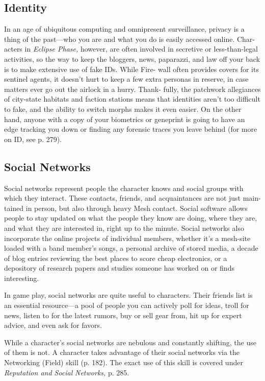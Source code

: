 \subsection{Identity}

In an age of ubiquitous computing and omnipresent 
surveillance, privacy is a thing of the past—who you 
are and what you do is easily accessed online. Char-
acters in \textit{Eclipse Phase,} however, are often involved 
in secretive or less-than-legal activities, so the way to 
keep the bloggers, news, paparazzi, and law off your 
back is to make extensive use of fake IDs. While Fire-
wall often provides covers for its sentinel agents, it 
doesn't hurt to keep a few extra personas in reserve, in 
case matters ever go out the airlock in a hurry. Thank-
fully, the patchwork allegiances of city-state habitats 
and faction stations means that identities aren't too 
difficult to fake, and the ability to switch morphs 
makes it even easier. On the other hand, anyone with a 
copy of your biometrics or geneprint is going to have 
an edge tracking you down or finding any forensic 
traces you leave behind (for more on ID, see p. 279).

\subsection{Social Networks}

Social networks represent people the character knows 
and social groups with which they interact. These 
contacts, friends, and acquaintances are not just main-
tained in person, but also through heavy Mesh contact. 
Social software allows people to stay updated on what 
the people they know are doing, where they are, and 
what they are interested in, right up to the minute. 
Social networks also incorporate the online projects 
of individual members, whether it's a mesh-site loaded 
with a band member's songs, a personal archive of 
stored media, a decade of blog entries reviewing the 
best places to score cheap electronics, or a depository 
of research papers and studies someone has worked 
on or finds interesting.

In game play, social networks are quite useful 
to characters. Their friends list is an essential 
resource—a pool of people you can actively poll for 
ideas, troll for news, listen to for the latest rumors, 
buy or sell gear from, hit up for expert advice, and 
even ask for favors.

While a character's social networks are nebulous 
and constantly shifting, the use of them is not. A 
character takes advantage of their social networks via 
the Networking (Field) skill (p. 182). The exact use 
of this skill is covered under \textit{Reputation and Social }
\textit{Networks,} p. 285.

